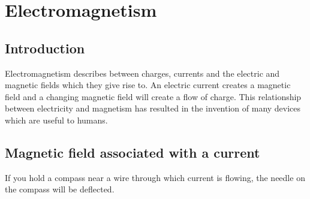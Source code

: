 \chapter{Electromagnetism}
\label{p:em:em11}

\section{Introduction}

Electromagnetism describes between charges, currents and the electric and magnetic fields which they give rise to. An electric current creates a magnetic field and a changing magnetic field will create a flow of charge. This relationship between electricity and magnetism has resulted in the invention of many devices which are useful to humans.

\section{Magnetic field associated with a current}

If you hold a compass near a wire through which current is
flowing, the needle on the compass will be deflected.

